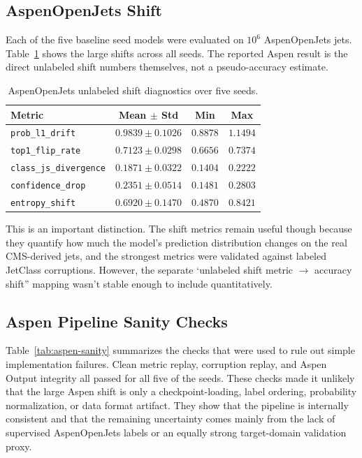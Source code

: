 \subsection{AspenOpenJets Shift}

Each of the five baseline seed models were evaluated on $10^6$  AspenOpenJets jets. Table~\ref{tab:aspen-shift} shows the large shifts across all seeds. The reported Aspen result is the direct unlabeled shift numbers themselves, not a pseudo-accuracy estimate.

\begin{table}[t]
\centering
\caption{AspenOpenJets unlabeled shift diagnostics over five seeds.}
\label{tab:aspen-shift}
\begin{tabular}{lccc}
\toprule
Metric & Mean $\pm$ Std & Min & Max \\
\midrule
\texttt{prob\_l1\_drift} & $0.9839 \pm 0.1026$ & $0.8878$ & $1.1494$ \\
\texttt{top1\_flip\_rate} & $0.7123 \pm 0.0298$ & $0.6656$ & $0.7374$ \\
\texttt{class\_js\_divergence} & $0.1871 \pm 0.0322$ & $0.1404$ & $0.2222$ \\
\texttt{confidence\_drop} & $0.2351 \pm 0.0514$ & $0.1481$ & $0.2803$ \\
\texttt{entropy\_shift} & $0.6920 \pm 0.1470$ & $0.4870$ & $0.8421$ \\
\bottomrule
\end{tabular}
\end{table}

This is an important distinction. The shift metrics remain useful though because they quantify how much the model’s prediction distribution changes on the real CMS-derived jets, and the strongest metrics were validated against labeled JetClass corruptions. However, the separate ‘unlabeled shift metric $\rightarrow$ accuracy shift'' mapping wasn’t stable enough to include quantitatively. 


\subsection{Aspen Pipeline Sanity Checks}

Table~\ref{tab:aspen-sanity} summarizes the checks that were used to rule out simple implementation failures. Clean metric replay, corruption replay, and Aspen Output integrity all passed for all five of the seeds. These checks made it unlikely that the large Aspen shift is only a checkpoint-loading, label ordering, probability normalization, or data format artifact. They show that the pipeline is internally consistent and that the remaining uncertainty comes mainly from the lack of supervised AspenOpenJets labels or an equally strong target-domain validation proxy.

